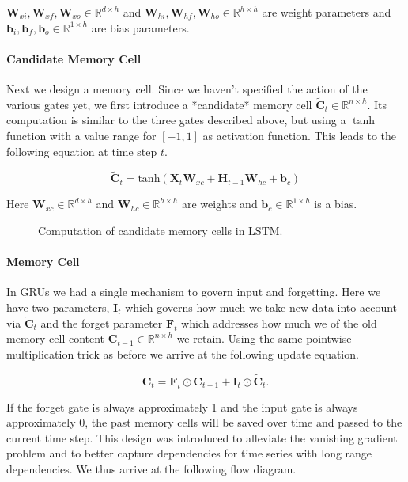 $\mathbf{W}_{xi}, \mathbf{W}_{xf}, \mathbf{W}_{xo} \in \mathbb{R}^{d \times h}$ and $\mathbf{W}_{hi}, \mathbf{W}_{hf}, \mathbf{W}_{ho} \in \mathbb{R}^{h \times h}$ are weight parameters and $\mathbf{b}_i, \mathbf{b}_f, \mathbf{b}_o \in \mathbb{R}^{1 \times h}$ are bias parameters.

\paragraph{Candidate Memory Cell}

Next we design a memory cell. Since we haven't specified the action of the various gates yet, we first introduce a *candidate* memory cell $\tilde{\mathbf{C}}_t \in \mathbb{R}^{n \times h}$. Its computation is similar to the three gates described above, but using a $\tanh$ function with a value range for $[-1, 1]$ as activation function. This leads to the following equation at time step $t$.

$$\tilde{\mathbf{C}}_t = \text{tanh}(\mathbf{X}_t \mathbf{W}_{xc} + \mathbf{H}_{t-1} \mathbf{W}_{hc} + \mathbf{b}_c)$$

Here $\mathbf{W}_{xc} \in \mathbb{R}^{d \times h}$ and $\mathbf{W}_{hc} \in \mathbb{R}^{h \times h}$ are weights and $\mathbf{b}_c \in \mathbb{R}^{1 \times h}$ is a bias.

\begin{figure}[hpt]
	\centering
	
	\caption{Computation of candidate memory cells in LSTM.}
	\label{fig:lstm_1}
\end{figure}


\paragraph{Memory Cell}

In GRUs we had a single mechanism to govern input and forgetting. Here we have two parameters, $\mathbf{I}_t$ which governs how much we take new data into account via $\tilde{\mathbf{C}}_t$ and the forget parameter $\mathbf{F}_t$ which addresses how much we of the old memory cell content $\mathbf{C}_{t-1} \in \mathbb{R}^{n \times h}$ we retain. Using the same pointwise multiplication trick as before we arrive at the following update equation.

$$\mathbf{C}_t = \mathbf{F}_t \odot \mathbf{C}_{t-1} + \mathbf{I}_t \odot \tilde{\mathbf{C}}_t.$$

If the forget gate is always approximately 1 and the input gate is always approximately 0, the past memory cells will be saved over time and passed to the current time step. This design was introduced to alleviate the vanishing gradient problem and to better capture dependencies for time series with long range dependencies. We thus arrive at the following flow diagram.


